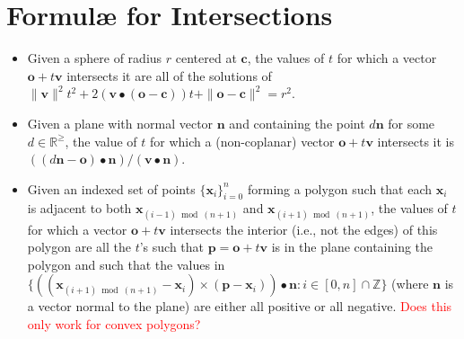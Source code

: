 \documentclass{article}
\newcommand{\comm}{\textcolor{red}}  %
\renewcommand{\v}{\mathbf}
\newcommand{\Z}{\mathbb{Z}}
\newcommand{\R}{\mathbb{R}}
\begin{document}
\section*{Formul\ae{} for Intersections}
\begin{itemize}

\item Given a sphere of radius $r$ centered at $\v{c}$, the values of $t$ for
which a vector $\v{o}+t\v{v}$ intersects it are all of the solutions of
$\|\v{v}\|^2 t^2 + 2(\v{v}\bullet(\v{o}-\v{c})) t + \|\v{o}-\v{c}\|^2 = r^2$.

\item Given a plane with normal vector $\v{n}$ and containing the point
$d\v{n}$ for some $d\in\R^\geq$, the value of $t$ for which a (non-coplanar)
vector $\v{o}+t\v{v}$ intersects it is $((d\v{n}-\v{o})\bullet\v{n}) /
(\v{v}\bullet\v{n})$.

\item Given an indexed set of points $\{\v{x}_i\}_{i=0}^n$ forming a polygon
such that each $\v{x}_i$ is adjacent to both $\v{x}_{(i-1)\bmod(n+1)}$ and
$\v{x}_{(i+1)\bmod(n+1)}$, the values of $t$ for which a vector $\v{o}+t\v{v}$
intersects the interior (i.e., not the edges) of this polygon are all the $t$'s
such that $\v{p} = \v{o}+t\v{v}$ is in the plane containing the polygon and
such that the values in $\{((\v{x}_{(i+1)\bmod(n+1)} - \v{x}_i)\times(\v{p} -
\v{x}_i))\bullet\v{n} : i\in[0,n]\cap\Z\}$ (where $\v{n}$ is a vector normal to
the plane) are either all positive or all negative.  \comm{Does this only work
for convex polygons?}

\end{itemize}
\end{document}
